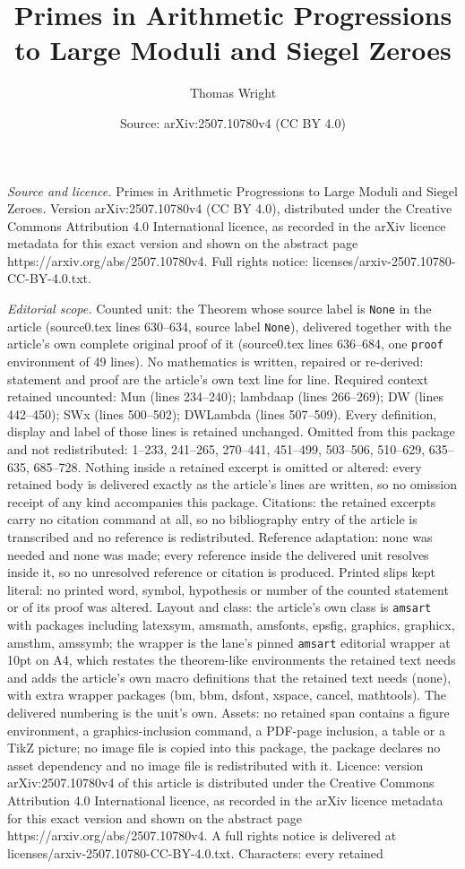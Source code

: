 \documentclass[10pt,a4paper]{amsart}
\title[Primes in Arithmetic Progressions to Large Moduli and Siegel]{Primes in Arithmetic Progressions to Large Moduli and Siegel Zeroes}
\author{Thomas Wright}
\date{Source: arXiv:2507.10780v4 (CC BY 4.0)}
\begin{document}
\maketitle

\noindent\emph{Source and licence.} Primes in Arithmetic Progressions to Large Moduli and Siegel Zeroes. Version arXiv:2507.10780v4 (CC BY 4.0), distributed under the Creative Commons Attribution 4.0 International licence, as recorded in the arXiv licence metadata for this exact version and shown on the abstract page https://arxiv.org/abs/2507.10780v4. Full rights notice: licenses/arxiv-2507.10780-CC-BY-4.0.txt.\par\smallskip

\noindent\textit{Editorial scope.} Counted unit: the Theorem whose source label is \texttt{None} in the article (source0.tex lines 630--634, source label \texttt{None}), delivered together with the article's own complete original proof of it (source0.tex lines 636--684, one \texttt{proof} environment of 49 lines). No mathematics is written, repaired or re-derived: statement and proof are the article's own text line for line. Required context retained uncounted: Mun (lines 234--240); lambdaap (lines 266--269); DW (lines 442--450); SWx (lines 500--502); DWLambda (lines 507--509). Every definition, display and label of those lines is retained unchanged. Omitted from this package and not redistributed: 1--233, 241--265, 270--441, 451--499, 503--506, 510--629, 635--635, 685--728. Nothing inside a retained excerpt is omitted or altered: every retained body is delivered exactly as the article's lines are written, so no omission receipt of any kind accompanies this package. Citations: the retained excerpts carry no citation command at all, so no bibliography entry of the article is transcribed and no reference is redistributed. Reference adaptation: none was needed and none was made; every reference inside the delivered unit resolves inside it, so no unresolved reference or citation is produced. Printed slips kept literal: no printed word, symbol, hypothesis or number of the counted statement or of its proof was altered. Layout and class: the article's own class is \texttt{amsart} with packages including latexsym, amsmath, amsfonts, epsfig, graphics, graphicx, amsthm, amssymb; the wrapper is the lane's pinned \texttt{amsart} editorial wrapper at 10pt on A4, which restates the theorem-like environments the retained text needs and adds the article's own macro definitions that the retained text needs (none), with extra wrapper packages (bm, bbm, dsfont, xspace, cancel, mathtools). The delivered numbering is the unit's own. Assets: no retained span contains a figure environment, a graphics-inclusion command, a PDF-page inclusion, a table or a TikZ picture; no image file is copied into this package, the package declares no asset dependency and no image file is redistributed with it. Licence: version arXiv:2507.10780v4 of this article is distributed under the Creative Commons Attribution 4.0 International licence, as recorded in the arXiv licence metadata for this exact version and shown on the abstract page https://arxiv.org/abs/2507.10780v4. A full rights notice is delivered at licenses/arxiv-2507.10780-CC-BY-4.0.txt. Characters: every retained 
\end{document}
